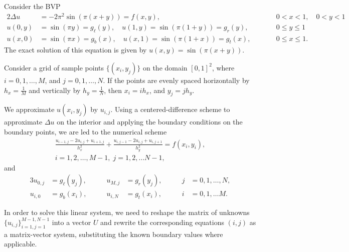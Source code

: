 \documentclass{homework}
\begin{document}
	\maketitle
	
	\question Consider the BVP
	\begin{alignat*}{2}
		\Delta u &= -2\pi^2\sin(\pi(x+y)) = f(x,y), &\qquad &0<x<1, \quad 0<y<1 \\
		u(0,y) &= \sin(\pi y) = g_\ell(y), \quad u(1, y) = \sin(\pi(1+y)) = g_r(y), & \qquad &0 \le y \le 1\\
		u(x,0) &= \sin(\pi x) = g_b(x), \quad u(x, 1) = \sin(\pi(1+x)) = g_t(x), & \qquad &0 \le x \le 1. 
	\end{alignat*}
	The exact solution of this equation is given by $u(x,y) = \sin(\pi(x+y))$.
	
	\begin{alphaparts}
		\questionpart Consider a grid of sample points $\{(x_i, y_j)\}$ on the domain $[0,1]^2$, where $i = 0,1,\dots, M$, and $j = 0,1,\dots, N$. If the points are evenly spaced horizontally by $h_x = \frac{1}{M}$ and vertically by $h_y = \frac{1}{N}$, then $x_i = ih_x$, and $y_j = jh_y$.
		
		We approximate $u(x_i,y_j)$ by $u_{i,j}$. Using a centered-difference scheme to approximate $\Delta u$ on the interior and applying the boundary conditions on the boundary points, we are led to the numerical scheme
		\begin{equation*}
			\tag{$i,j$}
			\begin{split}
				\frac{u_{i-1,j} - 2u_{i,j} + u_{i+1,j}}{h_x^2} + \frac{u_{i,j-1} -2 u_{i,j} + u_{i,j+1}}{h_y^2} = f(x_i, y_i),\\  i=1,2,\dots, M-1,\; j=1,2,\dots N-1,
			\end{split}
		\end{equation*}
		and
		\begin{alignat*}{3}
			u_{0,j} &= g_\ell(y_j),& \qquad u_{M,j} &= g_r(y_j),& \qquad j&=0,1,\dots,N,\\
			u_{i,0} &= g_b(x_i), & \qquad u_{i,N} &= g_t(x_i),& \qquad i&=0,1,\dots M.
		\end{alignat*}
		
		In order to solve this linear system, we need to reshape the matrix of unknowns $\{u_{i,j}\}_{i=1,j=1}^{M-1,N-1}$ into a vector $U$ and rewrite the corresponding equations $(i,j)$ as a matrix-vector system, substituting the known boundary values where applicable.
		

\end{alphaparts}
\end{document}
